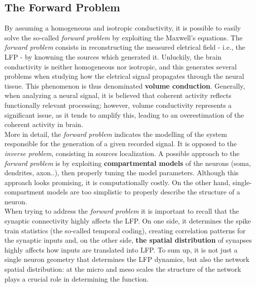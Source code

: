 \subsection{The Forward Problem}
By assuming a homogeneous and isotropic conductivity, it is possible to easily
solve the so-called \textit{forward problem} by exploiting the Maxwell's equations.
The \textit{forward problem} consists in reconstructing the measured eletrical field
- i.e., the LFP - by knowning the sources which generated it. Unluckily, the
brain conductivity is neither homogeneous nor isotropic, and this generates several
problems when studying how the eletrical signal propagates through the neural tissue.
This phenomenon is thus denominated \textbf{volume conduction}. Generally, when
analyzing a neural signal, it is believed that coherent activity reflects functionally
relevant processing; however, volume conductivity represents a significant issue, as
it tends to amplify this, leading to an overestimation of the coherent activity
in brain.\\

More in detail, the \textit{forward problem} indicates the modelling of the system
responsible for the generation of a given recorded signal. It is opposed to the
\textit{inverse problem}, consisting in sources localization. A possible approach
to the \textit{forward problem} is by exploiting \textbf{compartmental models} of the neurons (soma, dendrites, axon..), then
properly tuning the model parameters. Although this approach looks promising,
it is computationally costly. On the other hand, single-compartment models
are too simplistic to properly describe the structure of a neuron.\\

When trying to address the \textit{forward problem} it is important to recall
that the synaptic connectivity highly affects the LFP. On one side, it
determines the spike train statistics (the so-called temporal coding), creating
correlation patterns for the synaptic inputs and, on the other side, \textbf{the spatial
distribution} of synapses highly affects how inputs are translated into LFP.
To sum up, it is not just a single neuron geometry that determines the LFP
dynamics, but also the network spatial distribution: at the micro and meso
scales the structure of the network plays a crucial role in determining
the function.

